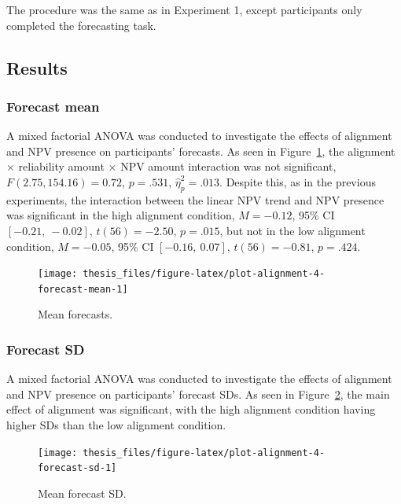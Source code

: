 \documentclass[a4paper, nobind, dvipsnames]{templates/ociamthesis}
\theoremstyle{definition}
\theoremstyle{definition}
\theoremstyle{definition}
\theoremstyle{definition}
\theoremstyle{remark}
\begin{document}
The procedure was the same as in Experiment 1, except participants only
completed the forecasting task.

\subsection{Results}

\subsubsection{Forecast mean}

A mixed factorial ANOVA was conducted to investigate the effects of alignment
and NPV presence on participants' forecasts. As seen in
Figure~\ref{fig:plot-alignment-4-forecast-mean}, the alignment \(\times\)
reliability amount \(\times\) NPV amount interaction was not significant,
\(F(2.75, 154.16) = 0.72\), \(p = .531\), \(\hat{\eta}^2_p = .013\).
Despite this, as in the previous experiments, the interaction between the linear
NPV trend and NPV presence was significant in the high alignment condition,
\(M = -0.12\), 95\% CI \([-0.21,~-0.02]\), \(t(56) = -2.50\), \(p = .015\), but not in the
low alignment condition,
\(M = -0.05\), 95\% CI \([-0.16,~0.07]\), \(t(56) = -0.81\), \(p = .424\).



\begin{figure}
\texttt{[image: thesis\_files/figure-latex/plot-alignment-4-forecast-mean-1]} \caption{Mean forecasts.}\label{fig:plot-alignment-4-forecast-mean}
\end{figure}

\hypertarget{forecast-sd-alignment-4}{%
\subsubsection{Forecast SD}\label{forecast-sd-alignment-4}}

A mixed factorial ANOVA was conducted to investigate the effects of alignment
and NPV presence on participants' forecast SDs. As seen in
Figure~\ref{fig:plot-alignment-4-forecast-sd}, the main effect of alignment was
significant, with the high alignment condition having higher SDs than the low
alignment condition.



\begin{figure}
\texttt{[image: thesis\_files/figure-latex/plot-alignment-4-forecast-sd-1]} \caption{Mean forecast SD.}\label{fig:plot-alignment-4-forecast-sd}
\end{figure}
\end{document}
